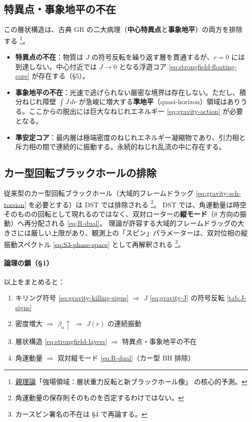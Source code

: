 \documentclass[dvipdfmx,a4paper,oneside]{jsbook}
\numberwithin{equation}{chapter}
\begin{document}
\subsection{特異点・事象地平の不在}

この層状構造は、古典 GR の二大病理（\textbf{中心特異点}と\textbf{事象地平}）の両方を排除する \footnote{\hyperref[sec:sister-manuscripts]{親理論}「強場領域：層状重力反転と新ブラックホール像」 の核心的予測。}。

\begin{itemize}[leftmargin=2em]
  \item \textbf{特異点の不在}：物質は \(J\) の符号反転を繰り返す層を貫通するが、\(r = 0\) には到達しない。中心付近では \(J \to 0\) となる浮遊コア \eqref{eq:strongfield-floating-core} が存在する（§5）。
  \item \textbf{事象地平の不在}：光速で逃げられない厳密な境界は存在しない。ただし、積分ねじれ障壁 \(\int J\, dr\) が急峻に増大する\textbf{準地平}（quasi-horizon）領域はありうる。ここからの脱出には巨大なねじれエネルギー \eqref{eq:gravity-action} が必要となる。
  \item \textbf{準安定コア}：最内層は極端密度のねじれエネルギー凝縮物であり、引力相と斥力相の間で連続的に振動する。永続的ねじれ乱流の中に存在する。
\end{itemize}

\subsection{カー型回転ブラックホールの排除}

従来型のカー型回転ブラックホール（大域的フレームドラッグ \eqref{eq:gravity-sch-torsion} を必要とする）は DST では排除される \footnote{角運動量の保存則そのものを否定するわけではない。}。
DST では、角運動量は時空そのものの回転として現れるのではなく、双対ローターの\textbf{縦モード}（\(\theta\) 方向の振動）へ再分配される \eqref{eq:R-dual}。
理論が許容する大域的フレームドラッグの大きさには厳しい上限があり、観測上の「スピン」パラメーターは、双対位相の縦振動スペクトル \eqref{eq:S3-phase-space} として再解釈される \footnote{カースピン署名の不在は §4 で再論する。}。

\paragraph{論理の鎖（§1）}
以上をまとめると：
\begin{enumerate}[leftmargin=2em]
  \item キリング符号 \eqref{eq:gravity-killing-signs} \(\Rightarrow\) \(J\) \eqref{eq:gravity-J} の符号反転 \eqref{tab:J-signs}
  \item 密度増大 \(\Rightarrow\) \(\beta_a \uparrow\) \(\Rightarrow\) \(J(r)\) の連続振動
  \item 層状構造 \eqref{eq:strongfield-layers} \(\Rightarrow\) 特異点・事象地平の不在
  \item 角運動量 \(\Rightarrow\) 双対縦モード \eqref{eq:R-dual}（カー型 BH 排除）
\end{enumerate}
\end{document}
